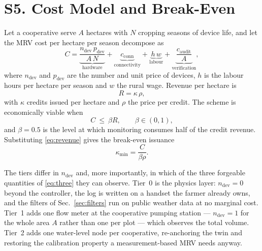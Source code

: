 \section*{S5. Cost Model and Break-Even}
\label{sec:cost}

Let a cooperative serve $A$ hectares with $N$ cropping seasons of device life,
and let the MRV cost per hectare per season decompose as
\begin{equation}
C=\underbrace{\frac{n_{\mathrm{dev}}\,p_{\mathrm{dev}}}{A\,N}}_{\text{hardware}}
+\underbrace{c_{\mathrm{conn}}}_{\text{connectivity}}
+\underbrace{h\,w}_{\text{labour}}
+\underbrace{\frac{c_{\mathrm{audit}}}{A}}_{\text{verification}},
\label{eq:cost}
\end{equation}
where $n_{\mathrm{dev}}$ and $p_{\mathrm{dev}}$ are the number and unit price of
devices, $h$ is the labour hours per hectare per season and $w$ the rural wage.
Revenue per hectare is
\begin{equation}
R=\kappa\,\rho ,
\label{eq:revenue}
\end{equation}
with $\kappa$ credits issued per hectare and $\rho$ the price per credit. The
scheme is economically viable when
\begin{equation}
C\ \le\ \beta R ,\qquad \beta\in(0,1),
\label{eq:breakeven}
\end{equation}
and $\beta=0.5$ is the level at which monitoring consumes half of the credit
revenue. Substituting \eqref{eq:revenue} gives the break-even issuance
\begin{equation}
\kappa_{\min}=\frac{C}{\beta\rho}.
\label{eq:kappamin}
\end{equation}

The tiers differ in $n_{\mathrm{dev}}$ and, more importantly, in which of the
three forgeable quantities of \eqref{eq:three} they can observe. Tier~0 is the
physics layer: $n_{\mathrm{dev}}=0$ beyond the controller, the log is written on
a handset the farmer already owns, and the filters of Sec.~\ref{sec:filters} run
on public weather data at no marginal cost. Tier~1 adds one flow meter at the
cooperative pumping station --- $n_{\mathrm{dev}}=1$ for the whole area $A$
rather than one per plot --- which observes the total volume. Tier~2 adds one
water-level node per cooperative, re-anchoring the twin and restoring the
calibration property a measurement-based MRV needs anyway.

